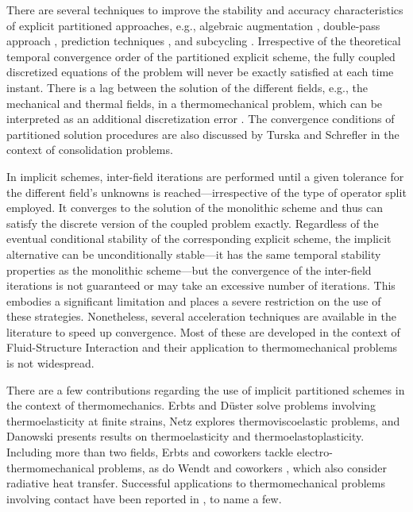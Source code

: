 There are several techniques to improve the stability and accuracy characteristics of explicit partitioned approaches, e.g., algebraic augmentation \citep{park_stabilization_1977, park_stabilization_1983}, double-pass approach \citep{armero_new_1992, piperno_explicitimplicit_1997, farhat_provably_2006, farhat_robust_2010}, prediction techniques \citep{piperno_explicitimplicit_1997, piperno_partitioned_2001, michler_efficient_2005, farhat_provably_2006}, and subcycling \citep{piperno_partitioned_1995, farhat_high_1997, piperno_explicitimplicit_1997}.
Irrespective of the theoretical temporal convergence order of the partitioned explicit scheme, the fully coupled discretized equations of the problem will never be exactly satisfied at each time instant.
There is a lag between the solution of the different fields, e.g., the mechanical and thermal fields, in a thermomechanical problem, which can be interpreted as an additional discretization error \citep{michler_efficient_2005}.
The convergence conditions of partitioned solution procedures are also discussed by Turska and Schrefler \citep{turskaConvergenceConditionsPartitioned1993a} in the context of consolidation problems.

In implicit schemes, inter-field iterations are performed until a given tolerance for the different field's unknowns is reached---irrespective of the type of operator split employed.
It converges to the solution of the monolithic scheme and thus can satisfy the discrete version of the coupled problem exactly.
Regardless of the eventual conditional stability of the corresponding explicit scheme, the implicit alternative can be unconditionally stable---it has the same temporal stability properties as the monolithic scheme---but the convergence of the inter-field iterations is not guaranteed or may take an excessive number of iterations.
This embodies a significant limitation and places a severe restriction on the use of these strategies.
Nonetheless, several acceleration techniques are available in the literature to speed up convergence.
Most of these are developed in the context of Fluid-Structure Interaction and their application to thermomechanical problems is not widespread.

There are a few contributions regarding the use of implicit partitioned schemes in the context of thermomechanics.
Erbts and Düster \citep{erbts_accelerated_2012} solve problems involving thermoelasticity at finite strains, Netz \citep{netz_high-order_2013} explores thermoviscoelastic problems, and Da\-now\-ski \citep{danowski_computational_2014} presents results on thermoelasticity and thermoelastoplasticity.
Including more than two fields, Erbts and coworkers \citep{erbts_partitioned_2015} tackle electro-thermomechanical problems, as do Wendt and coworkers \citep{wendt_partitioned_2015}, which also consider radiative heat transfer.
Successful applications to thermomechanical problems involving contact have been reported in \citet{johansson_thermoelastic_1993,rieger2004AdaptiveMethodsThermomechanical,temizer2011ThermomechanicalContactHomogenization,kruger2020PorousductileFractureThermoelastoplastic}, to name a few.

